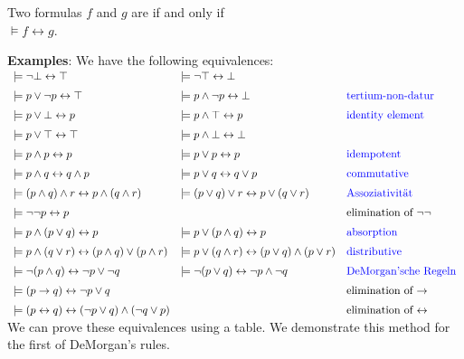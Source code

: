 \begin{Definition}[Equivalent]
  Two formulas $f$ and $g$ are   if and only if  \\[0.2cm]
  \hspace*{1.3cm} $\models f \leftrightarrow g$.   
  \eox
\end{Definition}

\noindent
\textbf{Examples}:  We have the following equivalences: \\[0.3cm]
\hspace*{0.3cm} 
$\begin{array}{lll}
\models \neg \falsum \leftrightarrow \verum & \models \neg \verum \leftrightarrow \falsum &  \\[0.2cm]
 \models p \vee   \neg p \leftrightarrow \verum & \models p \wedge \neg p \leftrightarrow \falsum & \mbox{\blue{tertium-non-datur}} \\[0.2cm]
 \models p \vee   \falsum \leftrightarrow p & \models p \wedge \verum  \leftrightarrow p & \mbox{\blue{identity element}}\\[0.2cm]
 \models p \vee   \verum  \leftrightarrow \verum & \models p \wedge \falsum \leftrightarrow \falsum &  \\[0.2cm]
 \models p \wedge p \leftrightarrow p  & \models p \vee p \leftrightarrow p &  \mbox{\blue{idempotent}}\index{idempotent} \\[0.2cm]
 \models p \wedge q \leftrightarrow q \wedge p & \models p \vee   q \leftrightarrow q \vee p & \mbox{\blue{commutative}}\index{commutative} \\[0.2cm]
 \models (p \wedge q) \wedge r \leftrightarrow p \wedge (q \wedge r) & \models (p \vee   q) \vee r \leftrightarrow p \vee   (q \vee r)  &
 \mbox{\blue{Assoziativität}}\index{associative} \\[0.2cm]
 \models \neg \neg p \leftrightarrow p & & \mbox{elimination of $\neg \neg$} \\[0.2cm]
 \models p \wedge (p \vee q)   \leftrightarrow p & \models p \vee   (p \wedge q) \leftrightarrow p &  \mbox{\blue{absorption}}\index{absorption} \\[0.2cm]
 \models p \wedge (q \vee r)   \leftrightarrow (p \wedge q) \vee   (p \wedge r) & 
 \models p \vee   (q \wedge r) \leftrightarrow (p \vee q)   \wedge (p \vee   r) & \mbox{\blue{distributive}}\index{distributive} \\[0.2cm]
 \models \neg (p \wedge q) \leftrightarrow  \neg p \vee   \neg q &  \models \neg (p \vee   q) \leftrightarrow  \neg p \wedge \neg q &
 \mbox{\blue{DeMorgan'sche Regeln}}\index{DeMorgan rules}  \\[0.2cm]
 \models (p \rightarrow q) \leftrightarrow \neg p \vee q & &  \mbox{elimination of $\rightarrow$} \\[0.2cm]
 \models (p \leftrightarrow q) \leftrightarrow (\neg p \vee q) \wedge (\neg q \vee p) & & \mbox{elimination of $\leftrightarrow$}
\end{array}$ \\[0.3cm]
We can prove these equivalences using a table.  We demonstrate this method for the first of DeMorgan's rules.

